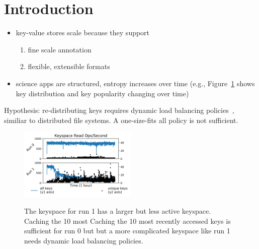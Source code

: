 \section{Introduction}

\begin{itemize}
  \item key-value stores scale because they support
  \begin{enumerate}
    \item fine scale annotation
    \item flexible, extensible formats
  \end{enumerate}
  \item science apps are structured, entropy increases over time (e.g.,
  Figure~\ref{fig:keyspace-regimes} shows key distribution and key popularity
  changing over time)
\end{itemize}

Hypothesis: re-distributing keys requires dynamic load balancing
policies~\cite{perez:jctc20150parsplice}, similiar to distributed file systems.
A one-size-fits all policy is not sufficient.

\begin{figure}[t]
  \noindent\includegraphics[width=0.5\textwidth]{figures/keyspace-regimes.png}\\
  \caption{The keyspace for run 1 has a larger but less active keyspace.
  Caching the 10 most Caching the 10 most recently accessed keys is sufficient
  for run 0 but but a more complicated keyspace like run 1 needs dynamic load
  balancing policies.\label{fig:keyspace-regimes}}
\end{figure}


